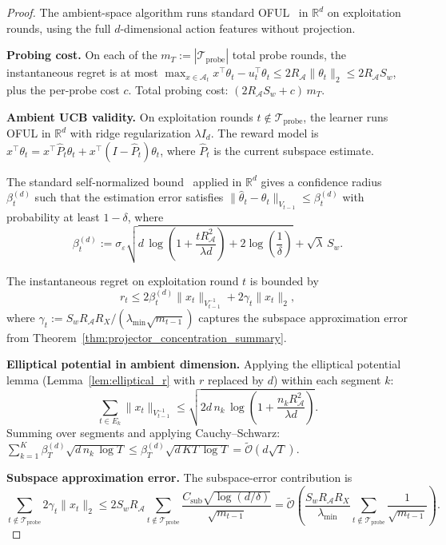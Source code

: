 \documentclass{article}
\newcommand{\R}{\mathbb{R}}
\newcommand{\cA}{\mathcal{A}}
\newcommand{\cTprobe}{\mathcal{T}_{\mathrm{probe}}}
\newcommand{\tilO}{\widetilde{\mathcal{O}}}
\begin{document}
\begin{proof}
The ambient-space algorithm runs standard OFUL~\citep{abbasi2011improved} in $\R^d$ on exploitation rounds, using the full $d$-dimensional action features without projection.

\textbf{Probing cost.}
On each of the $m_T := |\cTprobe|$ total probe rounds, the instantaneous regret is at most $\max_{x \in \cA_t} x^\top\theta_t - u_t^\top\theta_t \le 2R_{\cA}\|\theta_t\|_2 \le 2R_{\cA} S_w$, plus the per-probe cost $c$.  Total probing cost: $(2R_{\cA} S_w + c)\,m_T$.

\textbf{Ambient UCB validity.}
On exploitation rounds $t \notin \cTprobe$, the learner runs OFUL in $\R^d$ with ridge regularization $\lambda I_d$.  The reward model is $x^\top \theta_t = x^\top \widehat P_t \theta_t + x^\top(I - \widehat P_t)\theta_t$, where $\widehat P_t$ is the current subspace estimate.

The standard self-normalized bound~\citep[Theorem~1]{abbasi2011improved} applied in $\R^d$ gives a confidence radius $\beta_t^{(d)}$ such that the estimation error satisfies $\|\widehat\theta_t - \theta_t\|_{V_{t-1}} \le \beta_t^{(d)}$ with probability at least $1-\delta$, where
\[
\beta_t^{(d)} := \sigma_\varepsilon\sqrt{d\,\log\!\left(1 + \frac{t R_{\cA}^2}{\lambda d}\right) + 2\log\!\left(\frac{1}{\delta}\right)} + \sqrt{\lambda}\,S_w.
\]

The instantaneous regret on exploitation round $t$ is bounded by
\[
r_t \le 2\beta_t^{(d)}\|x_t\|_{V_{t-1}^{-1}} + 2\gamma_t\|x_t\|_2,
\]
where $\gamma_t := S_w R_{\cA} R_X/(\lambda_{\min}\sqrt{m_{t-1}})$ captures the subspace approximation error from Theorem~\ref{thm:projector_concentration_summary}.

\textbf{Elliptical potential in ambient dimension.}
Applying the elliptical potential lemma (Lemma~\ref{lem:elliptical_r} with $r$ replaced by $d$) within each segment $k$:
\[
\sum_{t \in E_k} \|x_t\|_{V_{t-1}^{-1}} \le \sqrt{2d\,n_k\,\log\!\left(1 + \frac{n_k R_{\cA}^2}{\lambda d}\right)}.
\]
Summing over segments and applying Cauchy--Schwarz: $\sum_{k=1}^K \beta_T^{(d)} \sqrt{d\,n_k\,\log T} \le \beta_T^{(d)}\sqrt{d\,KT\,\log T} = \tilO(d\sqrt{T})$.

\textbf{Subspace approximation error.}
The subspace-error contribution is
\[
\sum_{t \notin \cTprobe} 2\gamma_t\|x_t\|_2
\le 2S_w R_{\cA} \sum_{t \notin \cTprobe} \frac{C_{\mathrm{sub}}\sqrt{\log(d/\delta)}}{\sqrt{m_{t-1}}}
= \tilO\!\left(\frac{S_w R_{\cA} R_X}{\lambda_{\min}} \sum_{t \notin \cTprobe} \frac{1}{\sqrt{m_{t-1}}}\right).
\]


\end{proof}
\end{document}
